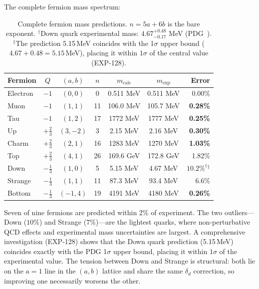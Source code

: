\documentclass[12pt,a4paper]{article}
\begin{document}
The complete fermion mass spectrum:

\begin{table}[H]
\centering
\begin{tabular}{lcccccr}
\toprule
\textbf{Fermion} & $Q$ & $(a,b)$ & $n$ & $m_{\text{calc}}$ & $m_{\text{exp}}$ & \textbf{Error} \\
\midrule
Electron & $-1$ & $(0,0)$ & 0 & 0.511 MeV & 0.511 MeV & 0.00\% \\
Muon & $-1$ & $(1,1)$ & 11 & 106.0 MeV & 105.7 MeV & \textbf{0.28\%} \\
Tau & $-1$ & $(1,2)$ & 17 & 1772 MeV & 1777 MeV & \textbf{0.25\%} \\
\midrule
Up & $+\tfrac{2}{3}$ & $(3,-2)$ & 3 & 2.15 MeV & 2.16 MeV & \textbf{0.30\%} \\
Charm & $+\tfrac{2}{3}$ & $(2,1)$ & 16 & 1283 MeV & 1270 MeV & \textbf{1.03\%} \\
Top & $+\tfrac{2}{3}$ & $(4,1)$ & 26 & 169.6 GeV & 172.8 GeV & 1.82\% \\
\midrule
Down & $-\tfrac{1}{3}$ & $(1,0)$ & 5 & 5.15 MeV & 4.67 MeV & $10.2\%^\dagger\!^\ddagger$ \\
Strange & $-\tfrac{1}{3}$ & $(1,1)$ & 11 & 87.3 MeV & 93.4 MeV & 6.6\% \\
Bottom & $-\tfrac{1}{3}$ & $(-1,4)$ & 19 & 4191 MeV & 4180 MeV & \textbf{0.26\%} \\
\bottomrule
\end{tabular}
\caption{Complete fermion mass predictions. $n = 5a + 6b$ is the bare exponent. $^\dagger$Down quark experimental mass: $4.67^{+0.48}_{-0.17}$ MeV (PDG~\cite{pdg2024}). $^\ddagger$The prediction 5.15\,MeV coincides with the 1$\sigma$ upper bound ($4.67 + 0.48 = 5.15$\,MeV), placing it within $1\sigma$ of the central value (EXP-128).}
\end{table}

Seven of nine fermions are predicted within 2\% of experiment. The two outliers---Down ($10\%$) and Strange ($7\%$)---are the lightest quarks, where non-perturbative QCD effects and experimental mass uncertainties are largest. A comprehensive investigation (EXP-128) shows that the Down quark prediction (5.15\,MeV) coincides exactly with the PDG 1$\sigma$ upper bound, placing it within $1\sigma$ of the experimental value. The tension between Down and Strange is structural: both lie on the $a = 1$ line in the $(a,b)$ lattice and share the same $\delta_d$ correction, so improving one necessarily worsens the other.
\end{document}
